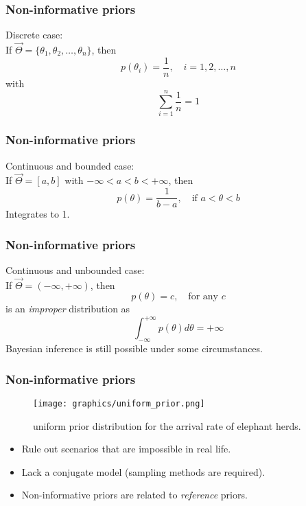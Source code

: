 \documentclass{beamer}
\newcommand{\1}{\ensuremath{\mathbf{1}}}
\begin{document}
%
%
%
\begin{frame}\frametitle{Non-informative priors}
	Discrete case:\\[1.5ex]
	If $\vec\Theta = \{\theta_1, \theta_2, \ldots, \theta_n\}$, then
	\begin{equation}
		p(\theta_i) = \frac{1}{n}, \quad i=1,2,\ldots,n	
	\end{equation}
	with
	\begin{equation}
		\sum_{i=1}^n \frac{1}{n} = 1
	\end{equation}
\end{frame}
%
%
%
\begin{frame}\frametitle{Non-informative priors}
	Continuous and bounded case:\\[1.5ex]
	If $\vec\Theta = [a,b]$ with $-\infty < a < b < +\infty$, then
	\begin{equation}
		p(\theta) = \frac{1}{b-a}, \quad \text{if $a < \theta < b$} 	
	\end{equation}
	Integrates to 1.
\end{frame}
%
%
%
\begin{frame}\frametitle{Non-informative priors}
	Continuous and unbounded case:\\[1.5ex]
	If $\vec\Theta = (-\infty, +\infty)$, then
	\begin{equation}
		p(\theta) = c, \quad \text{for any $c$} 	
	\end{equation}
	is an \emph{improper} distribution as
	\begin{equation}
		\int_{-\infty}^{+\infty} p(\theta) d\theta = +\infty
	\end{equation}
	Bayesian inference is still possible under some circumstances.
\end{frame}
%
%
%
\begin{frame}\frametitle{Non-informative priors}
	\begin{figure}
	\begin{center}
		\texttt{[image: graphics/uniform\_prior.png]}
	\end{center}
	\caption{uniform prior distribution for the arrival rate of elephant herds.}
	\end{figure}
	\begin{itemize}
		\item Rule out scenarios that are impossible in real life.
		\item Lack a conjugate model (sampling methods are required).
		\item Non-informative priors are related to \emph{reference} priors.
	\end{itemize}
\end{frame}
\end{document}
